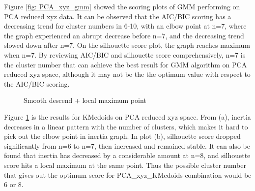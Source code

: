 \documentclass[a4paper]{article}
\begin{document}
Figure \ref{fig: PCA_xyz_gmm} showed the scoring plots of GMM performing on PCA reduced xyz data. It can be observed that the AIC/BIC scoring has a decreasing trend for cluster numbers in 6-10, with an elbow point at n=7, where the graph experienced an abrupt decrease before n=7, and the decreasing trend slowed down after n=7. On the silhouette score plot, the graph reaches maximum when n=7. By reviewing AIC/BIC and silhouette score comprehensively, n=7 is the cluster number that can achieve the best result for GMM algorithm on PCA reduced xyz space, although it may not be the the optimum value with respect to the AIC/BIC scoring.

\begin{figure}[H]
    \centering
    \caption{Smooth descend + local maximum point}
    \label{fig: PCA_xyz_kmedoids}
\end{figure}

Figure \ref{fig: PCA_xyz_kmedoids} is the results for KMedoids on PCA reduced xyz space. From (a), inertia decreases in a linear pattern with the number of clusters, which makes it hard to pick out the elbow point in inertia graph. In plot (b), silhouette score dropped significantly from n=6 to n=7, then increased and remained stable. It can also be found that inertia has decreased by a considerable amount at n=8, and silhouette score hits a local maximum at the same point. Thus the possible cluster number that gives out the optimum score for PCA\_xyz\_KMedoids combination would be 6 or 8.
\end{document}
